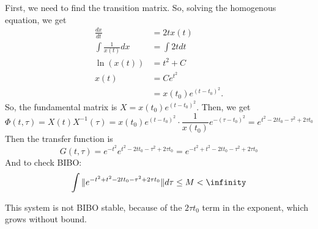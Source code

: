 \documentclass[10pt]{article}
\begin{document}
First, we need to find the transition matrix.
So, solving the homogenous equation, we get 
\begin{equation*}
\begin{split}
\frac{dx}{dt} &= 2tx(t) \\ 
\int \frac{1}{x(t)}dx &= \int 2t dt\\
\ln(x(t)) &= t^2 + C\\
x(t) &= Ce^{t^2}\\
&= x(t_0)e^{(t-t_0)^2}.
\end{split}
\end{equation*}
So, the fundamental matrix is $X = x(t_0)e^{(t-t_0)^2}$.
Then, we get 
\begin{equation*}
  \Phi(t,\tau) = X(t) X^{-1}(\tau) =
  x(t_0)e^{(t-t_0)^2}\cdot\frac{1}{x(t_0)}e^{-(\tau - t_0)^2}
 = e^{t^2 - 2tt_0 - \tau^2 + 2\tau t_0}
\end{equation*}
Then the transfer function is
\begin{equation*}
  G(t,\tau) = e^{-t^2}e^{t^2 - 2tt_0 - \tau^2 + 2\tau t_0}
  = e^{-t^2 + t^2 - 2tt_0 - \tau^2 + 2\tau t_0}
\end{equation*}
And to check BIBO:
\begin{equation*}
  \int \Vert e^{-t^2 + t^2 - 2tt_0 - \tau^2 + 2\tau
    t_0}\Vert d\tau \le M < \infinity
\end{equation*}

This system is not BIBO stable, because of the $2\tau t_0$ term in the
exponent, which grows without bound.
\end{document}

